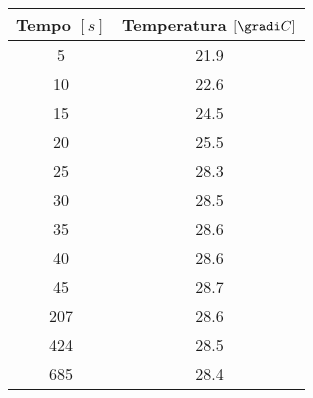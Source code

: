 \begin{tabular}{cc}
\toprule
\multicolumn{1}{c}{Tempo $[s]$} & \multicolumn{1}{c}{Temperatura $[\gradi C]$} \\ \hline
5 & 21.9 \\ \hline
10 & 22.6 \\ \hline
15 & 24.5 \\ \hline
20 & 25.5 \\ \hline
25 & 28.3 \\ \hline
30 & 28.5 \\ \hline
35 & 28.6 \\ \hline
40 & 28.6 \\ \hline
45 & 28.7 \\ \hline
207 & 28.6 \\ \hline
424 & 28.5 \\ \hline
685 & 28.4 \\ 
\bottomrule
\end{tabular}

